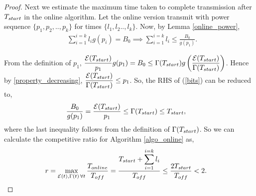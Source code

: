 \begin{proof}
Next we estimate the maximum time taken to complete transmission after $T_{\mbox{\scriptsize{start}}}$ in the online algorithm. Let the online version transmit with power sequence $\{p_1,p_2,..,p_k\}$ for times $\{l_1,l_2..,l_k\} $. Now, by Lemma \ref{online_power},
\begin{align}
&\sum_{i=1}^{i=k}l_ig(p_i)=B_0\implies\sum_{i=1}^{i=k}l_i\le \frac{B_0}{g(p_1)}.\label{bits}
\end{align}

From the definition of $p_1$, $\dfrac{\ETx(T_{\mbox{\scriptsize{start}}})}{p_1}g(p_1)=B_0 \le \TRx(T_{\mbox{\scriptsize{start}}}) g\left( \dfrac{\ETx(T_{\mbox{\scriptsize{start}}})}{\TRx(T_{\mbox{\scriptsize{start}}})} \right)$. Hence by \eqref{property_decreasing}, $\dfrac{\ETx(T_{\mbox{\scriptsize{start}}})}{\TRx(T_{\mbox{\scriptsize{start}}})}\le p_1$.\vspace{2pt}
So, the RHS of (\ref{bits}) can be reduced to, 
\begin{align}
&\frac{B_0}{g(p_1)} = \frac{\ETx(T_{\mbox{\scriptsize{start}}})}{p_1} \le \TRx(T_{\mbox{\scriptsize{start}}})\le T_{\mbox{\scriptsize{start}}},
\end{align}
where the last inequality follows from the definition of $\TRx(T_{\mbox{\scriptsize{start}}})$. So we can calculate the competitive ratio for Algorithm \ref{algo_online} as,
\begin{align*}
&r=\displaystyle\max_{\ETx(t),\TRx(t)\hspace{0.5mm} \forall t}\dfrac{T_{\mbox{\scriptsize{online}}}}{T_{\mbox{\scriptsize{off}}}} = \dfrac{T_{\mbox{\scriptsize{start}}}+\displaystyle\sum_{i=1}^{i=k}l_i}{T_{\mbox{\scriptsize{off}}}} \le \dfrac{2 T_{\mbox{\scriptsize{start}}}}{T_{\mbox{\scriptsize{off}}}} < 2.
\end{align*}
\end{proof}
